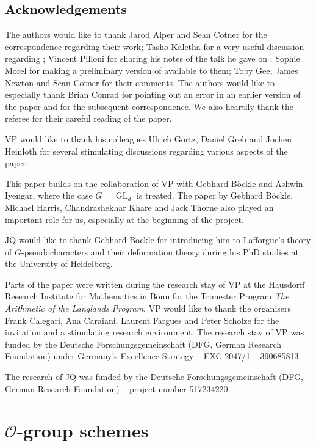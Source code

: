 \documentclass{amsart}
\theoremstyle{definition}
\theoremstyle{remark}
\DeclareMathOperator{\GL}{GL}
\newcommand{\OO}{\mathcal O}
\begin{document}
\subsection{Acknowledgements} The authors would like to thank 
Jarod Alper and Sean Cotner for the correspondence regarding their work; 
Tasho Kaletha for a very useful discussion regarding ;
Vincent Pilloni for sharing his notes of the talk he gave on \cite{BIP_new}; 
Sophie Morel for making a preliminary version of \cite{emerson2023comparison}
available to them; Toby Gee, James Newton and Sean Cotner for their comments. The authors would 
like to especially thank Brian Conrad for pointing out an error in an
earlier version of the paper and for the subsequent correspondence. We also heartily thank the referee for their careful reading of the paper.

VP would like to thank his colleagues  Ulrich G\"ortz, Daniel Greb and 
Jochen Heinloth for several stimulating discussions regarding various aspects 
of the paper.

This paper builds on the  collaboration \cite{BIP_new} of VP with Gebhard B\"ockle and Ashwin Iyengar, where the case $G=\GL_d$ is treated.
The paper \cite{BHKT} by Gebhard B\"{o}ckle, Michael Harris, Chandrashekhar Khare
and Jack Thorne also played an important role for us, especially at the beginning of the 
project. 

JQ would like to thank Gebhard Böckle for introducing him to Lafforgue’s theory 
of $G$-pseudocharacters and their deformation theory during his PhD studies at the 
University of Heidelberg.


Parts of the paper were written during the research stay of VP at 
the Hausdorff Research Institute for Mathematics in Bonn 
for the Trimester Program \emph{The Arithmetic of the Langlands Program}.
VP would like to thank the organisers 
Frank Calegari, Ana Caraiani, Laurent Fargues and  Peter Scholze
for the invitation and a stimulating research environment. 
The research stay of VP was funded by the Deutsche Forschungsgemeinschaft (DFG, German Research Foundation) under Germany's Excellence Strategy – EXC-2047/1 – 390685813. 

The research of JQ was funded by the Deutsche Forschungsgemeinschaft (DFG, German Research Foundation) – project number 517234220.




\section{\texorpdfstring{$\OO$-group schemes}{O-group schemes}}\label{sec_grp_sch}
\end{document}
